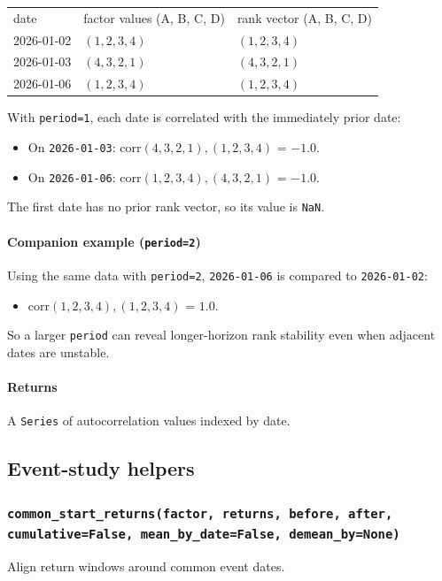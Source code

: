 \documentclass[11pt]{article}
\begin{document}
\begin{center}
\begin{tabular}{lll}
date & factor values (A, B, C, D) & rank vector (A, B, C, D) \\
2026-01-02 & \((1, 2, 3, 4)\) & \((1, 2, 3, 4)\) \\
2026-01-03 & \((4, 3, 2, 1)\) & \((4, 3, 2, 1)\) \\
2026-01-06 & \((1, 2, 3, 4)\) & \((1, 2, 3, 4)\) \\
\end{tabular}
\end{center}

With \texttt{period=1}, each date is correlated with the immediately prior date:

\begin{itemize}
  \item On \texttt{2026-01-03}: corr\((4, 3, 2, 1), (1, 2, 3, 4)\) = \(-1.0\).
  \item On \texttt{2026-01-06}: corr\((1, 2, 3, 4), (4, 3, 2, 1)\) = \(-1.0\).
\end{itemize}

The first date has no prior rank vector, so its value is \texttt{NaN}.

\paragraph{Companion example (\texttt{period=2})}
Using the same data with \texttt{period=2}, \texttt{2026-01-06} is compared to \texttt{2026-01-02}:

\begin{itemize}
  \item corr\((1, 2, 3, 4), (1, 2, 3, 4)\) = \(1.0\).
\end{itemize}

So a larger \texttt{period} can reveal longer-horizon rank stability even when adjacent dates are unstable.

\paragraph{Returns}
A \texttt{Series} of autocorrelation values indexed by date.

\subsection{Event-study helpers}

\subsubsection{\texttt{common\_start\_returns(factor, returns, before, after, cumulative=False, mean\_by\_date=False, demean\_by=None)}}
Align return windows around common event dates.
\end{document}
